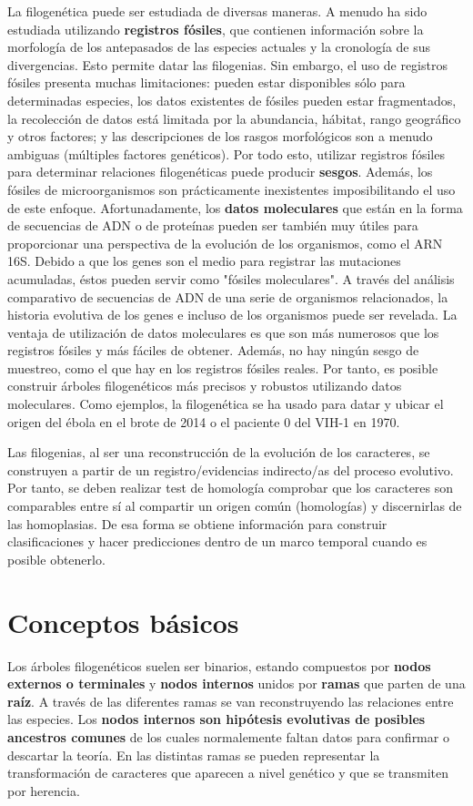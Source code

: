 La filogenética puede ser estudiada de diversas maneras. A menudo ha sido estudiada utilizando \textbf{registros fósiles}, que contienen información sobre la morfología de los antepasados de las especies actuales y la cronología de sus divergencias. Esto permite datar las filogenias. Sin embargo, el uso de registros fósiles presenta muchas limitaciones: pueden estar disponibles sólo para determinadas especies, los datos existentes de fósiles pueden estar fragmentados, la recolección de datos está limitada por la abundancia, hábitat, rango geográfico y otros factores; y las descripciones de los rasgos morfológicos son a menudo ambiguas (múltiples factores genéticos). Por todo esto, utilizar registros fósiles para determinar relaciones filogenéticas puede producir \textbf{sesgos}. Además, los fósiles de microorganismos son prácticamente inexistentes imposibilitando el uso de este enfoque. Afortunadamente, los \textbf{datos moleculares} que están en la forma de secuencias de ADN o de proteínas pueden ser también muy útiles para proporcionar una perspectiva de la evolución de los organismos, como el ARN 16S. Debido a que los genes son el medio para registrar las mutaciones acumuladas, éstos pueden servir como "fósiles moleculares". A través del análisis comparativo de secuencias de ADN de una serie de organismos relacionados, la historia evolutiva de los genes e incluso de los organismos puede ser revelada. La ventaja de utilización de datos moleculares es que son más numerosos que los registros fósiles y más fáciles de obtener. Además, no hay ningún sesgo de muestreo, como el que hay en los registros fósiles reales. Por tanto, es posible construir árboles filogenéticos más precisos y robustos utilizando datos moleculares. Como ejemplos, la filogenética se ha usado para datar y ubicar el origen del ébola en el brote de 2014 o el paciente 0 del VIH-1 en 1970.

Las filogenias, al ser una reconstrucción de la evolución de los caracteres, se construyen a partir de un registro/evidencias indirecto/as del proceso evolutivo. Por tanto, se deben realizar test de homología comprobar que los caracteres son comparables entre sí al compartir un origen común (homologías) y discernirlas de las homoplasias. De esa forma se obtiene información para construir clasificaciones y hacer predicciones dentro de un marco temporal cuando es posible obtenerlo.

\section{Conceptos básicos}
Los árboles filogenéticos suelen ser binarios, estando compuestos por \textbf{nodos externos o terminales} y \textbf{nodos internos} unidos por \textbf{ramas} que parten de una \textbf{raíz}. A través de las diferentes ramas se van reconstruyendo las relaciones entre las especies. Los \textbf{nodos internos son hipótesis evolutivas de posibles ancestros comunes} de los cuales normalemente faltan datos para confirmar o descartar la teoría. En las distintas ramas se pueden representar la transformación de caracteres que aparecen a nivel genético y que se transmiten por herencia.  

